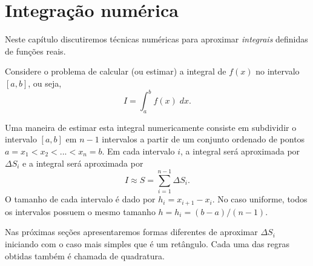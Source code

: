 
%

\chapter{Integração numérica} \label{cap:integracao}

Neste capítulo discutiremos técnicas numéricas para aproximar \emph{integrais} definidas de funções reais.

Considere o problema de calcular (ou estimar) a integral de $f(x)$ no intervalo $[a,b]$, ou seja,
$$
 I = \int_a^b f(x) \;dx.
$$

Uma maneira de estimar esta integral numericamente consiste em subdividir o intervalo $[a,b]$ em $n-1$ intervalos a partir de um conjunto ordenado de pontos $a=x_1<x_2<...<x_n=b$. Em cada intervalo $i$, a integral será aproximada por $\Delta S_i$ e a integral será aproximada por
$$
 I \approx S = \sum_{i=1}^{n-1} \Delta S_i.
$$
O tamanho de cada intervalo é dado por $h_i=x_{i+1}-x_i$. No caso uniforme, todos os intervalos possuem o mesmo tamanho $h=h_i=(b-a)/(n-1)$.

Nas próximas seções apresentaremos formas diferentes de aproximar $\Delta S_i$ iniciando com o caso mais simples que é um retângulo. Cada uma das regras obtidas também é chamada de quadratura.

